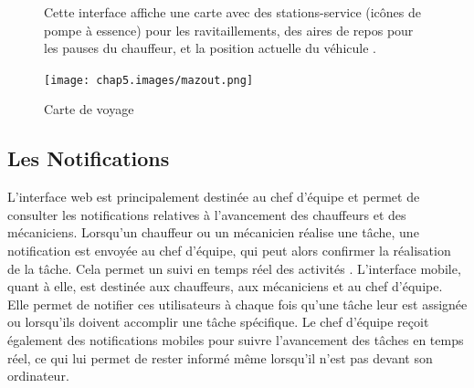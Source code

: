 \newpage

\begin{figure}[htbp]
    \centering
    \begin{minipage}{0.58\textwidth}
        \raggedright
        Cette interface affiche une carte avec des stations-service (icônes de pompe à essence) pour les ravitaillements, des aires de repos pour les pauses du chauffeur, et la position actuelle du véhicule .
    \end{minipage}
    \hfill
    \begin{minipage}{0.39\textwidth}
        \centering
        \texttt{[image: chap5.images/mazout.png]}
        \caption{Carte de voyage}

    \end{minipage}
\end{figure}



\subsection{Les Notifications}

L'interface web est principalement destinée au chef d'équipe et permet de consulter les notifications relatives à l'avancement des chauffeurs et des mécaniciens. Lorsqu'un chauffeur ou un mécanicien réalise une tâche, une notification est envoyée au chef d'équipe, qui peut alors confirmer la réalisation de la tâche. Cela permet un suivi en temps réel des activités . L'interface mobile, quant à elle, est destinée aux chauffeurs, aux mécaniciens et au chef d'équipe. Elle permet de notifier ces utilisateurs à chaque fois qu'une tâche leur est assignée ou lorsqu'ils doivent accomplir une tâche spécifique. Le chef d'équipe reçoit également des notifications mobiles pour suivre l'avancement des tâches en temps réel, ce qui lui permet de rester informé même lorsqu'il n'est pas devant son ordinateur.


